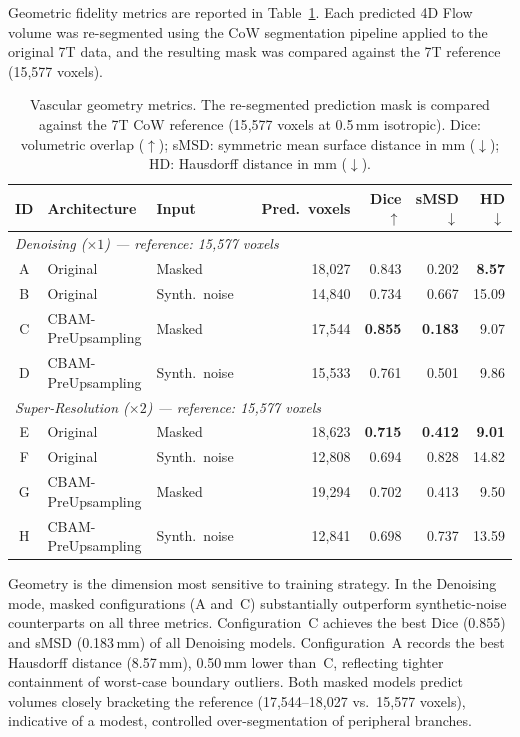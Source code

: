 Geometric fidelity metrics are reported in Table~\ref{tab:geometry}.  Each predicted 4D Flow
volume was re-segmented using the CoW segmentation pipeline applied to the original 7T data,
and the resulting mask was compared against the 7T reference (15{,}577 voxels).

\begin{table}[h!]
  \centering
  \caption{Vascular geometry metrics.  The re-segmented prediction mask is compared against the
  7T CoW reference (15{,}577 voxels at 0.5\,mm isotropic).  Dice: volumetric overlap
  ($\uparrow$); sMSD: symmetric mean surface distance in mm ($\downarrow$); HD: Hausdorff
  distance in mm ($\downarrow$).}
  \label{tab:geometry}
  \setlength{\tabcolsep}{4.5pt}
  \small
  \begin{tabular}{cll l r rrr}
    \toprule
    ID & Architecture & Input & & Pred.\ voxels &
      Dice $\uparrow$ & sMSD $\downarrow$ & HD $\downarrow$ \\
    \midrule
    \multicolumn{8}{l}{\textit{Denoising ($\times 1$) — reference: 15,577 voxels}} \\
    \midrule
    A & Original           & Masked        & & 18{,}027 & 0.843 & 0.202 & \textbf{8.57} \\
    B & Original           & Synth.\ noise & & 14{,}840 & 0.734 & 0.667 & 15.09 \\
    C & CBAM-PreUpsampling & Masked        & & 17{,}544 & \textbf{0.855} & \textbf{0.183} & 9.07 \\
    D & CBAM-PreUpsampling & Synth.\ noise & & 15{,}533 & 0.761 & 0.501 & 9.86 \\
    \midrule
    \multicolumn{8}{l}{\textit{Super-Resolution ($\times 2$) — reference: 15,577 voxels}} \\
    \midrule
    E & Original           & Masked        & & 18{,}623 & \textbf{0.715} & \textbf{0.412} & \textbf{9.01} \\
    F & Original           & Synth.\ noise & & 12{,}808 & 0.694 & 0.828 & 14.82 \\
    G & CBAM-PreUpsampling & Masked        & & 19{,}294 & 0.702 & 0.413 & 9.50 \\
    H & CBAM-PreUpsampling & Synth.\ noise & & 12{,}841 & 0.698 & 0.737 & 13.59 \\
    \bottomrule
  \end{tabular}
\end{table}

Geometry is the dimension most sensitive to training strategy.  In the Denoising mode, masked
configurations (A and~C) substantially outperform synthetic-noise counterparts on all three
metrics.  Configuration~C achieves the best Dice (0.855) and sMSD (0.183\,mm) of all Denoising
models.  Configuration~A records the best Hausdorff distance (8.57\,mm), 0.50\,mm lower than~C,
reflecting tighter containment of worst-case boundary outliers.  Both masked models predict
volumes closely bracketing the reference (17{,}544--18{,}027 vs.\ 15{,}577 voxels), indicative
of a modest, controlled over-segmentation of peripheral branches.

